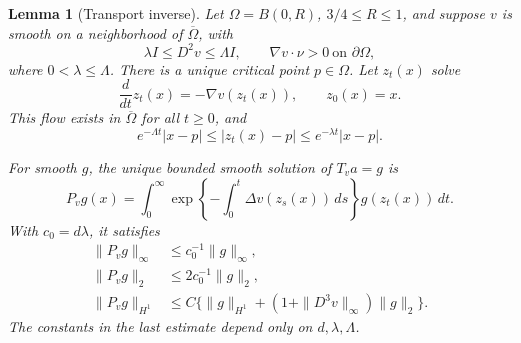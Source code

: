 \documentclass[11pt]{article}
\newtheorem{lemma}[theorem]{Lemma}
\theoremstyle{remark}
\begin{document}
\begin{lemma}[Transport inverse]\label{lem:transport}
Let \(\Omega=B(0,R)\), \(3/4\leq R\leq1\), and suppose \(v\) is
smooth on a neighborhood of \(\overline\Omega\), with
\begin{equation}\label{eq:geometry}
\lambda I\leq D^2v\leq\Lambda I,\qquad
\nabla v\cdot\nu>0\ \text{on }\partial\Omega,
\end{equation}
where \(0<\lambda\leq\Lambda\).
There is a unique critical point \(p\in\Omega\). 
Let \(z_t(x)\) solve
\[
\frac{d}{dt}z_t(x)=-\nabla v(z_t(x)),\qquad z_0(x)=x.
\]
This flow exists in \(\overline\Omega\) for all \(t\geq0\), and
\begin{equation}\label{eq:radial-flow}
e^{-\Lambda t}|x-p|
\leq |z_t(x)-p|
\leq e^{-\lambda t}|x-p|.
\end{equation}

For smooth \(g\), the unique bounded smooth solution of \(T_v a=g\)
is
\begin{equation}\label{eq:transport-inverse}
P_vg(x)=
\int_0^\infty
\exp\left\{-\int_0^t\Delta v(z_s(x))\,ds\right\}
g(z_t(x))\,dt.
\end{equation}
With \(c_0=d\lambda\), it satisfies
\begin{align}
\|P_vg\|_\infty&\leq c_0^{-1}\|g\|_\infty,\label{eq:P-infty}\\
\|P_vg\|_2&\leq 2c_0^{-1}\|g\|_2,\label{eq:P-L2}\\
\|P_vg\|_{H^1}
&\leq C\big\{\|g\|_{H^1}
 +(1+\|D^3v\|_\infty)\|g\|_2\big\}.
\label{eq:P-H1}
\end{align}
The constants in the last estimate depend only on \(d,\lambda,\Lambda\).
\end{lemma}
\end{document}
